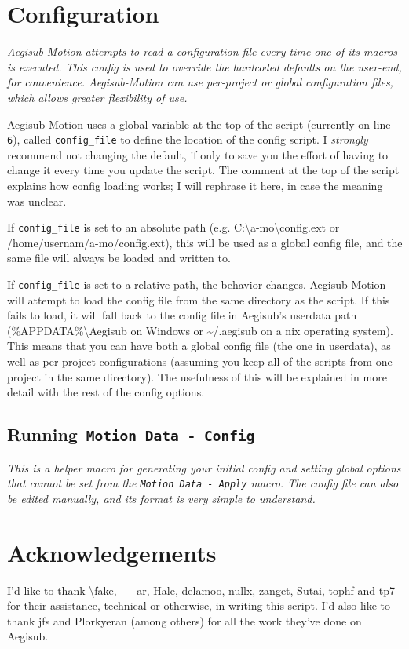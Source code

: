 ﻿\documentclass[a4paper,12pt]{article}
\begin{document}
  \section{Configuration}
  \emph{Aegisub-Motion attempts to read a configuration file every time one of its macros is executed. This config is used to override the hardcoded defaults on the user-end, for convenience. Aegisub-Motion can use per-project or global configuration files, which allows greater flexibility of use.}

  \medskip

  Aegisub-Motion uses a global variable at the top of the script (currently on line {\tt6}), called {\tt config\_file} to define the location of the config script. I \emph{strongly} recommend not changing the default, if only to save you the effort of having to change it every time you update the script. The comment at the top of the script explains how config loading works; I will rephrase it here, in case the meaning was unclear.
  
  If {\tt{}config\_file} is set to an absolute path (e.g. C:\textbackslash{}a-mo\textbackslash{}config.ext or /home/usernam/a-mo/config.ext), this will be used as a global config file, and the same file will always be loaded and written to.
  
  If {\tt{}config\_file} is set to a relative path, the behavior changes. Aegisub-Motion will attempt to load the config file from the same directory as the script. If this fails to load, it will fall back to the config file in Aegisub's userdata path (\%APPDATA\%\textbackslash{}Aegisub on Windows or \textasciitilde/.aegisub on a \*nix operating system). This means that you can have both a global config file (the one in userdata), as well as per-project configurations (assuming you keep all of the scripts from one project in the same directory). The usefulness of this will be explained in more detail with the rest of the config options.
  
  \subsection{Running{\tt{} Motion Data - Config}}
  \emph{This is a helper macro for generating your initial config and setting global options that cannot be set from the {\tt Motion Data - Apply} macro. The config file can also be edited manually, and its format is very simple to understand.}
  

    
  \section*{Acknowledgements}
  I'd like to thank \textbackslash{}fake, \_\_ar, Hale, delamoo, nullx, zanget, Sutai, tophf and tp7 for their assistance, technical or otherwise, in writing this script. I'd also like to thank jfs and Plorkyeran (among others) for all the work they've done on Aegisub.  
\end{document}
